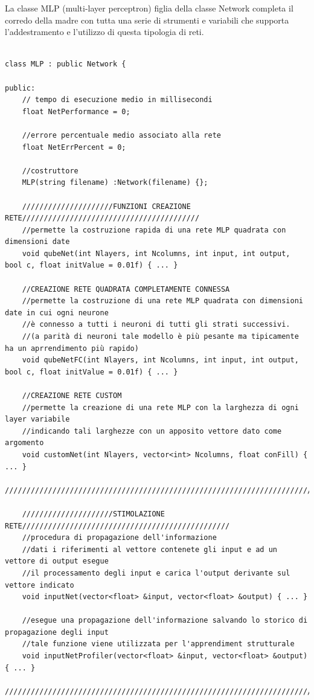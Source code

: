 \documentclass[10pt,a4paper]{article}
\begin{document}
La classe MLP (multi-layer perceptron) figlia della classe Network completa il corredo della madre con tutta una serie di strumenti e variabili che supporta l'addestramento e l'utilizzo di questa tipologia di reti.
\begin{lstlisting}[style=mycuda, caption=class MLP, captionpos=b]

class MLP : public Network {

public:
	// tempo di esecuzione medio in millisecondi
	float NetPerformance = 0; 
	
	//errore percentuale medio associato alla rete
	float NetErrPercent = 0; 
	
	//costruttore
	MLP(string filename) :Network(filename) {};

	/////////////////////FUNZIONI CREAZIONE RETE/////////////////////////////////////////
	//permette la costruzione rapida di una rete MLP quadrata con dimensioni date
	void qubeNet(int Nlayers, int Ncolumns, int input, int output, bool c, float initValue = 0.01f) { ... }
	
	//CREAZIONE RETE QUADRATA COMPLETAMENTE CONNESSA
	//permette la costruzione di una rete MLP quadrata con dimensioni date in cui ogni neurone
	//è connesso a tutti i neuroni di tutti gli strati successivi.
	//(a parità di neuroni tale modello è più pesante ma tipicamente ha un aprrendimento più rapido)
	void qubeNetFC(int Nlayers, int Ncolumns, int input, int output, bool c, float initValue = 0.01f) { ... }
	
	//CREAZIONE RETE CUSTOM
	//permette la creazione di una rete MLP con la larghezza di ogni layer variabile
	//indicando tali larghezze con un apposito vettore dato come argomento
	void customNet(int Nlayers, vector<int> Ncolumns, float conFill) { ... }
	//////////////////////////////////////////////////////////////////////////////////////
	
	/////////////////////STIMOLAZIONE RETE////////////////////////////////////////////////
	//procedura di propagazione dell'informazione
	//dati i riferimenti al vettore contenete gli input e ad un vettore di output esegue
	//il processamento degli input e carica l'output derivante sul vettore indicato
	void inputNet(vector<float> &input, vector<float> &output) { ... }
	
	//esegue una propagazione dell'informazione salvando lo storico di propagazione degli input
	//tale funzione viene utilizzata per l'apprendiment strutturale
	void inputNetProfiler(vector<float> &input, vector<float> &output) { ... }
	//////////////////////////////////////////////////////////////////////////////////////
	

\end{lstlisting}
\end{document}
